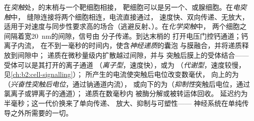 \begin{definition}[化学突触与电突触]\label{def:b2:neurons-synapses:synapse}
在\emph{突触}处，的末梢与一个靶细胞相接，
靶细胞可以是另一个、或腺细胞。在\emph{电突触}中，
缝隙连接将两个细胞相连，电流直接通过，
速度快、双向传递、无放大，
适用于对速度与同步性要求高的场合（逃避反射、）。在\emph{化学突触}中，
两个细胞之间隔着宽\qty{20}{nm}的间隙，信号由
分子传递。到达末梢的
打开电压门控钙通道；钙离子内流，
在不到一毫秒的时间内，使含\emph{神经递质}的囊泡
与膜融合，并将递质释放到间隙中；
递质在微秒量级内扩散越过间隙，并与
突触后膜上的受体结合——受体可以是其打开的离子通道
（\emph{离子型}，速度快），或为
（\emph{代谢型}，速度较慢，见\cref{ch:b2:cell-signalling}）；
所产生的电流使突触后电位改变数毫伏，
向上的为（\emph{兴奋性突触后电位}，通过钠通道内流），
或向下的为（\emph{抑制性}突触后电位，通过氯离子或钾离子的通道）；
递质在数毫秒内
被酶分解或被转运体回收。
延迟约为半毫秒；这一代价换来了单向传递、
放大、抑制与可塑性——
神经系统在单纯传导之外所需要的一切。
\end{definition}

